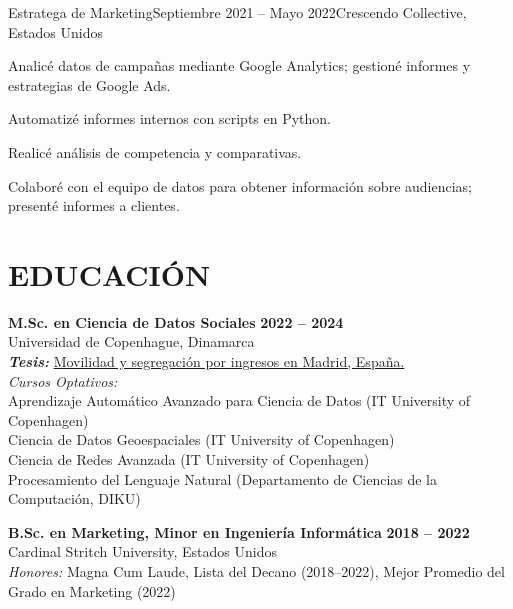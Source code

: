 \documentclass{resume}
\begin{document}
\begin{content}
    \begin{position}{Estratega de Marketing}{Septiembre 2021 -- Mayo 2022}{Crescendo Collective, Estados Unidos}{}{ }
        \item Analicé datos de campañas mediante Google Analytics; gestioné informes y estrategias de Google Ads.
        \item Automatizé informes internos con scripts en Python.
        \item Realicé análisis de competencia y comparativas.
        \item Colaboré con el equipo de datos para obtener información sobre audiencias; presenté informes a clientes.
    \end{position}
    
\end{content}

\section{EDUCACIÓN} 
\begin{content}
    {\bf M.Sc. en Ciencia de Datos Sociales} \hfill {\bf 2022 -- 2024} \\ 
    Universidad de Copenhague, Dinamarca \\ 
    {\bf \em Tesis:} {\href{https://github.com/carobs9/segregation-madrid}{Movilidad y segregación por ingresos en Madrid, España.}} \\ 
    {\em Cursos Optativos:} \\ 
    {\small
    Aprendizaje Automático Avanzado para Ciencia de Datos (IT University of Copenhagen) \\ 
    Ciencia de Datos Geoespaciales (IT University of Copenhagen) \\ 
    Ciencia de Redes Avanzada (IT University of Copenhagen) \\ 
    Procesamiento del Lenguaje Natural (Departamento de Ciencias de la Computación, DIKU) \\ 
    }

    {\bf B.Sc. en Marketing, Minor en Ingeniería Informática} \hfill {\bf 2018 -- 2022} \\ 
    Cardinal Stritch University, Estados Unidos \\ 
    {\em Honores:} Magna Cum Laude, Lista del Decano (2018--2022), Mejor Promedio del Grado en Marketing (2022)
\end{content}

\end{document}
